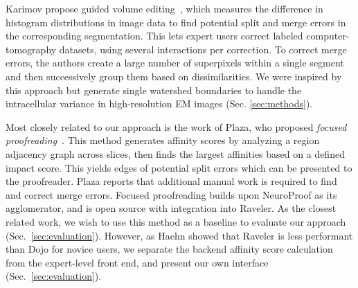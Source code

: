 
Karimov \etal propose guided volume editing~\cite{karimov_guided_volume_editing}, which measures the difference in histogram distributions in image data to find potential split and merge errors in the corresponding segmentation. This lets expert users correct labeled computer-tomography datasets, using several interactions per correction. To correct merge errors, the authors create a large number of superpixels within a single segment and then successively group them based on dissimilarities. We were inspired by this approach but generate single watershed boundaries to handle the intracellular variance in high-resolution EM images (Sec. \ref{sec:methods}).

Most closely related to our approach is the work of Plaza, who proposed \textit{focused proofreading}~\cite{focused_proofreading}. This method generates affinity scores by analyzing a region adjacency graph across slices, then finds the largest affinities based on a defined impact score. This yields edges of potential split errors which can be presented to the proofreader. Plaza reports that additional manual work is required to find and correct merge errors. Focused proofreading builds upon NeuroProof \cite{neuroproof2013} as its agglomerator, and is open source with integration into Raveler. As the closest related work, we wish to use this method as a baseline to evaluate our approach (Sec.~\ref{sec:evaluation}). However, as Haehn \etal showed that Raveler is less performant than Dojo for novice users, we separate the backend affinity score calculation from the expert-level front end, and present our own interface (Sec.~\ref{sec:evaluation}).

